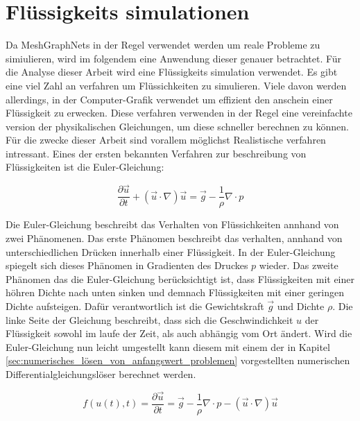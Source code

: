 
\section{Flüssigkeits simulationen} \label{sec:simulationen}

Da MeshGraphNets in der Regel verwendet werden um reale Probleme zu simiulieren, 
wird im folgendem eine Anwendung dieser genauer betrachtet.
Für die Analyse dieser Arbeit wird eine Flüssigkeits simulation verwendet.
Es gibt eine viel Zahl an verfahren um Flüssichkeiten zu simulieren.
Viele davon werden allerdings, in der Computer-Grafik verwendet um 
effizient den anschein einer Flüssigkeit zu erwecken.
Diese verfahren verwenden in der Regel eine vereinfachte version der physikalischen Gleichungen,
um diese schneller berechnen zu können.
Für die zwecke dieser Arbeit sind vorallem möglichst Realistische verfahren intressant.
Eines der ersten bekannten Verfahren zur beschreibung von Flüssigkeiten ist die Euler-Gleichung:

$$
\frac{\partial \vec{u}}{\partial t} + (\vec{u} \cdot \nabla) \vec{u} =  \vec{g} - \frac{1}{\rho} \nabla \cdot p
$$

Die Euler-Gleichung beschreibt das Verhalten von Flüssichkeiten annhand von zwei Phänomenen.
Das erste Phänomen beschreibt das verhalten, annhand von unterschiedlichen Drücken innerhalb einer Flüssigkeit.
In der Euler-Gleichung spiegelt sich dieses Phänomen in Gradienten des Druckes $p$ wieder.
Das zweite Phänomen das die Euler-Gleichung berücksichtigt ist, dass Flüssigkeiten mit
einer höhren Dichte nach unten sinken und demnach Flüssigkeiten mit einer geringen Dichte aufsteigen.
Dafür verantwortlich ist die Gewichtskraft $\vec{g}$ und Dichte $\rho$.
Die linke Seite der Gleichung beschreibt, dass sich die Geschwindichkeit $u$ der Flüssigkeit sowohl im laufe 
der Zeit, als auch abhängig vom Ort ändert.
Wird die Euler-Gleichung nun leicht umgestellt kann diesem mit einem der in Kapitel \ref{sec:numerisches_lösen_von_anfangswert_problemen} vorgestellten 
numerischen Differentialgleichungslöser berechnet werden.

$$
f(u(t), t) = \frac{\partial \vec{u}}{\partial t}  =  \vec{g} - \frac{1}{\rho} \nabla \cdot p -  (\vec{u} \cdot \nabla) \vec{u}
$$

